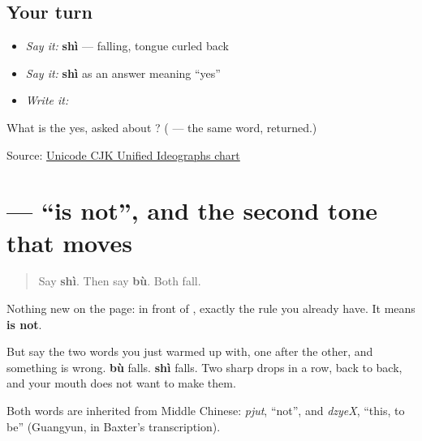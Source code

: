\subsection*{Your turn}
\begin{itemize}
\raggedright
  \item \emph{Say it:} \textbf{shì} — falling, tongue curled back
  \item \emph{Say it:} \textbf{shì} as an answer meaning \textquotedblleft{}yes\textquotedblright{}
  \item \emph{Write it:} 
\end{itemize}

\begin{tcolorbox}[breakable,colback=teal!4,colframe=teal!35!black,title={Before you move on}]
What is the yes, asked about ? (\textbf{} — the same word, returned.)

Source: \href{https://www.unicode.org/charts/PDF/U4E00.pdf}{Unicode CJK Unified Ideographs chart}
\end{tcolorbox}
\section[\texorpdfstring{\zh{不是} (bú shì)}{不是 (bú shì)}]{ — \textquotedblleft{}is not\textquotedblright{}, and the second tone that moves}

\label{lesson:ZH-C05-bushi}



\begin{quote}
Say \textbf{shì}. Then say \textbf{bù}. Both fall.
\end{quote}

\begin{cousinweb}
\begin{quote}
\end{quote}

Nothing new on the page: \textbf{} in front of \textbf{}, exactly the rule you already have. It means \textbf{is not}.

But say the two words you just warmed up with, one after the other, and something is wrong. \textbf{bù} falls. \textbf{shì} falls. Two sharp drops in a row, back to back, and your mouth does not want to make them.

Both words are inherited from Middle Chinese: \emph{pjut}, \textquotedblleft{}not\textquotedblright{}, and \emph{dzyeX}, \textquotedblleft{}this, to be\textquotedblright{} (Guangyun, in Baxter's transcription).
\end{cousinweb}

